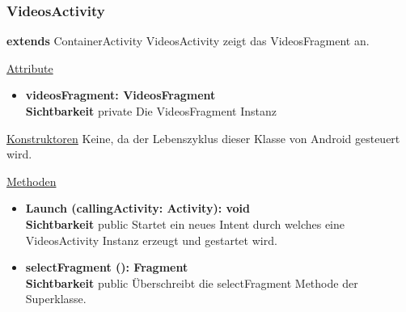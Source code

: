\subsubsection{VideosActivity}
\textbf{extends} ContainerActivity \newline
VideosActivity zeigt das VideosFragment an.
\newline

\underline{Attribute}
\begin{itemize}
\itemsep0pt
\item \textbf{videosFragment: VideosFragment} \hfill\\ 
\textbf{Sichtbarkeit} private\newline
Die VideosFragment Instanz

\end{itemize}

\underline{Konstruktoren}\newline
\indent Keine, da der Lebenszyklus dieser Klasse von Android gesteuert wird.\newline

\underline{Methoden}
\begin{itemize}
\itemsep0pt

\item \textbf{Launch (callingActivity: Activity): void}\hfill\\
\textbf{Sichtbarkeit} public\newline
Startet ein neues Intent durch welches eine VideosActivity Instanz erzeugt und gestartet wird.

\item \textbf{selectFragment (): Fragment}\hfill\\
\textbf{Sichtbarkeit} public\newline
Überschreibt die selectFragment Methode der Superklasse.

\end{itemize}